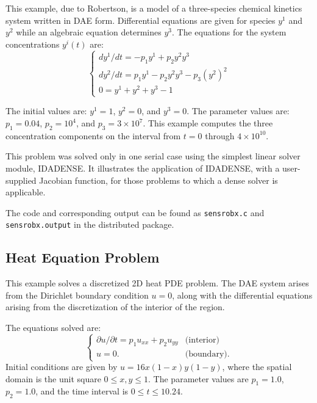This example, due to Robertson, is a model of a three-species chemical
kinetics system written in DAE form. 
Differential equations are given for species $y^1$ and $y^2$ while an
algebraic equation determines $y^3$.
The equations for the system concentrations $y^{i}(t)$ are:
\begin{equation}
\left\{ \begin{array}{l}
               dy^1/dt = -p_1 y^1 + p_2 y^2 y^3   \\
               dy^2/dt = p_1 y^1 - p_2 y^2 y^3 - p_3 (y^2)^2  \\
               0 =  y^1 + y^2 + y^3 - 1
\end{array} \right.                                       \label{robsys}
\end{equation}

The initial values are: $y^1=1$, $y^2=0$, and $y^3=0$.
The parameter values are: $p_1 = 0.04$, $p_2 = 10^4$, and $p_3 = 3
\times 10^7$.
This example computes the three concentration components on the
interval from $t=0$ through $4 \times 10^{10}$.

This problem was solved only in one serial case using the simplest
linear solver module, IDADENSE.
It illustrates the application of IDADENSE, with a user-supplied
Jacobian function, for those problems to which a dense solver is
applicable.

The code and corresponding output can be found as {\tt sensrobx.c} and
{\tt sensrobx.output} in the distributed package.

\subsection{Heat Equation Problem}

This example solves a discretized 2D heat PDE problem. The DAE system
arises from the Dirichlet boundary condition $u = 0$, along with the 
differential equations arising from the discretization of the interior 
of the region. 

The equations solved are:
\begin{equation}
\left\{ \begin{array}{ll}
     \partial u / \partial t  = p_1 u_{xx} + p_2 u_{yy}  & \mbox{(interior)} \\
      u = 0. & \mbox{(boundary)}.
\end{array} \right.                                       \label{heateqsys}
\end{equation}
Initial conditions are given by $u = 16x(1-x)y(1-y)$, where the spatial domain
is the unit square $0 \leq x,y \leq 1$.
The parameter values are $p_1 = 1.0$, $p_2 = 1.0$, and the time
interval is $0 \leq t \leq 10.24$.

